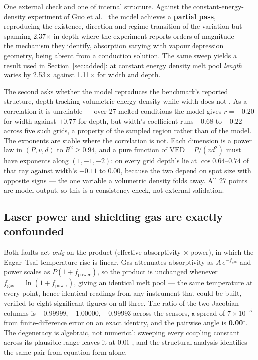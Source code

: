 \documentclass[preprint,times]{elsarticle}
\begin{document}
One external check and one of internal structure. Against the
constant-energy-density experiment of Guo et al.\ \cite{Guo2019} the model
achieves a \textbf{partial pass}, reproducing the existence, direction and regime
transition of the variation but spanning 2.37$\times$ in depth where the
experiment reports orders of magnitude --- the mechanism they identify,
absorption varying with vapour depression geometry, being absent from a
conduction solution. The same sweep yields a result used in
Section~\ref{sec:added}: at constant energy density melt pool \emph{length}
varies by 2.53$\times$ against 1.11$\times$ for width and depth.

The second asks whether the model reproduces the benchmark's reported structure,
depth tracking volumetric energy density while width does not \cite{Weaver2024}.
As a correlation it is unreliable --- over 27 melted conditions the model gives
$r=+0.20$ for width against $+0.77$ for depth, but width's coefficient runs
$+0.68$ to $-0.22$ across five such grids, a property of the sampled region
rather than of the model. The exponents are stable where the correlation is not.
Each dimension is a power law in $(P,v,d)$ to $R^{2}\ge0.94$, and a pure function
of $\mathrm{VED}=P/(vd^{2})$ must have exponents along $(1,-1,-2)$: on every grid
depth's lie at $\cos 0.64$--$0.74$ of that ray against width's $-0.11$ to
$0.00$, because the two depend on spot size with opposite signs --- the one
variable a volumetric density folds away. All 27 points are model output, so this
is a consistency check, not external validation.

\subsection{Laser power and shielding gas are exactly confounded}
\label{sec:confound}

Both faults act \emph{only} on the product (effective absorptivity $\times$
power), in which the Eagar--Tsai temperature rise is linear. Gas attenuates
absorptivity as $A\,e^{-f_{\mathrm{gas}}}$ and power scales as
$P(1+f_{\mathrm{power}})$, so the product is unchanged whenever
$f_{\mathrm{gas}}=\ln(1+f_{\mathrm{power}})$, giving an identical melt pool ---
the same temperature at every point, hence identical readings from any instrument
that could be built, verified to eight significant figures on all three. The
ratio of the two Jacobian columns is $-0.99999$, $-1.00000$, $-0.99993$ across
the sensors, a spread of $7\times10^{-5}$ from finite-difference error on an
exact identity, and the pairwise angle is \textbf{0.00$^\circ$}. The degeneracy
is algebraic, not numerical: sweeping every coupling constant across its
plausible range leaves it at $0.00^\circ$, and the structural analysis identifies
the same pair from equation form alone.
\end{document}
